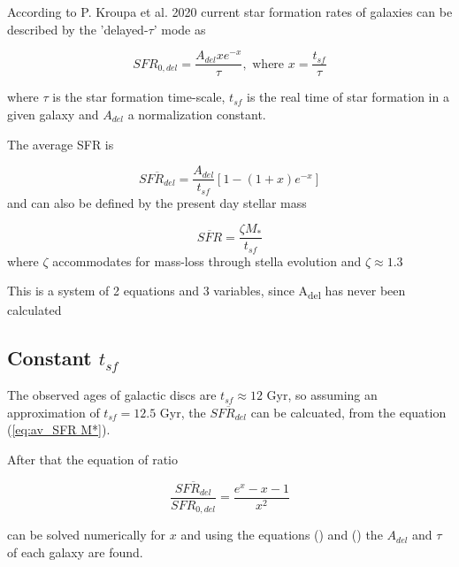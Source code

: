 \documentclass[a4paper,twocolumn]{article}
\begin{document}
According to P. Kroupa et al. 2020\autocite{kroupaConstraintsStarFormation2020} current star formation rates of galaxies can be described by the 'delayed-\(\tau\)' mode as


\begin{equation} \label{eq:SFR}
SFR_{0,del}=\frac{A_{del}xe^{-x}}{\tau},\text{ where } x=\frac{t_{sf}}{\tau}
\end{equation}


where \(\tau\) is the star formation time-scale,  \(t_{sf}\) is the real time of star formation in a given galaxy and \(A_{del}\) a normalization constant.

The average SFR is

\begin{equation}\label{eq:av_SFR-x}
\overline{SFR_{del}}=\frac{A_{del}}{t_{sf}}[1-(1+x)e^{-x}]
\end{equation}
and can also be defined by the present day stellar mass

\begin{equation}\label{eq:av_SFR M*}
    \overline{SFR}=\frac{\zeta M_*}{t_{sf}}
\end{equation}
where \(\zeta\) accommodates for mass-loss through stella evolution and \(\zeta\approx 1.3\)

This is a system of 2 equations and 3 variables, since A\textsubscript{del} has never been calculated

\subsection{Constant \(t_{sf}\)}
\label{sec:orgb5e0687}
The observed ages of galactic discs are \(t_{sf}\approx 12\) Gyr\autocite{knoxSurveyCoolWhite1999}, so assuming an approximation of \(t_{sf}=12.5\) Gyr, the \(\overline{SFR_{del}}\) can be calcuated, from the equation (\ref{eq:av_SFR M*}).

After that the equation of ratio



\begin{equation} \label{eq:ratio}
    \frac{\overline{SFR_{del}}}{SFR_{0,del}}=\frac{e^x-x-1}{x^2}
\end{equation}

can be solved numerically for \(x\) and using the equations () and () the \(A_{del}\) and \(\tau\) of each galaxy are found.
\end{document}

